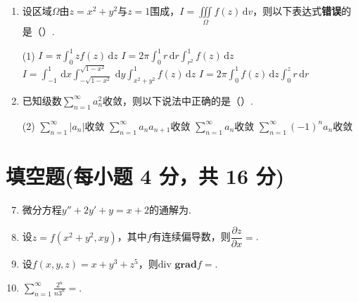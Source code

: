 \documentclass[../main.tex]{subfiles}
\begin{document}
\begin{enumerate}
    \item \begin{minipage}[t]{0.93\linewidth}
              设区域$\Omega$由$z=x^{2}+y^{2}$与$z=1$围成，\(I=\iiint\limits_{\Omega}f(z)\,\mathrm{d}v\)，则以下表达式\textbf{错误}的是（\qquad）.\par\smallskip
              \begin{tasks}[label=\textbf{\Alph*.}, label-width=1.5em, column-sep=1em](1)
                  \task $\displaystyle I=\pi\int_{0}^{1}zf(z)\,\mathrm{d}z$ \qquad
                  \task $\displaystyle I=2\pi\int_{0}^{1}r\,\mathrm{d}r\int_{r^{2}}^{1}f(z)\,\mathrm{d}z$
                  \task $\displaystyle I=\int_{-1}^{1}\,\mathrm{d}x\int_{-\sqrt{1-x^{2}}}^{\sqrt{1-x^{2}}}\,\mathrm{d}y\int_{x^{2}+y^{2}}^{1}f(z)\,\mathrm{d}z$
                  \task $\displaystyle I=2\pi\int_{0}^{1}f(z)\,\mathrm{d}z\int_{0}^{z}r\,\mathrm{d}r$
              \end{tasks}
          \end{minipage}

    \item 已知级数$\sum\limits_{n=1}^{\infty}a_{n}^{2}$收敛，则以下说法中正确的是（\qquad）.
          \begin{tasks}[label=\textbf{\Alph*.}, label-width=1.5em, column-sep=1em](2)
              \task $\displaystyle\sum_{n=1}^{\infty}|a_n|$收敛
              \task $\displaystyle\sum_{n=1}^{\infty}a_na_{n+1}$收敛
              \task $\displaystyle\sum_{n=1}^{\infty}a_n$收敛
              \task $\displaystyle\sum_{n=1}^{\infty}(-1)^na_n$收敛
          \end{tasks}
\end{enumerate}

\section{填空题(每小题 4 分，共 16 分)}
\begin{enumerate}
    \setcounter{enumi}{6}
    \item 微分方程$y''+2y'+y=x+2$的通解为\underline{\hspace{5em}}.
          \vspace{1em}

    \item 设$z=f(x^{2}+y^{2},xy)$，其中$f$有连续偏导数，则$\dfrac{\partial z}{\partial x}=$\underline{\hspace{5em}}.
          \vspace{1em}

    \item 设$f(x,y,z)=x+y^{3}+z^{5}$，则$\text{div }\textbf{grad}f=$\underline{\hspace{5em}}.
          \vspace{1em}

    \item $\displaystyle\sum_{n=1}^{\infty}\frac{2^{n}}{n3^{n}}=$\underline{\hspace{5em}}.
          \vspace{1em}
\end{enumerate}
\end{document}
